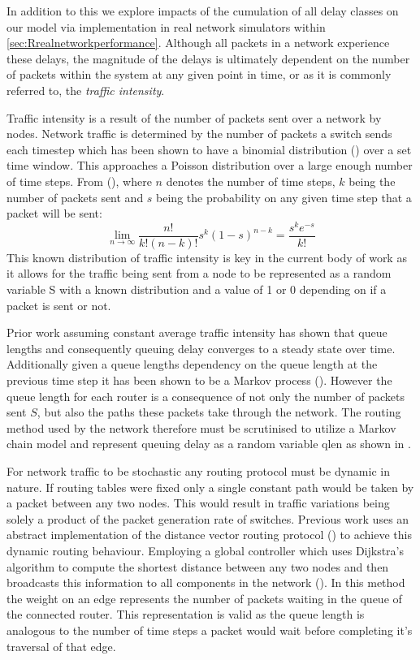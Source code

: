 In addition to this we explore impacts of the cumulation of all delay classes on our model via implementation in real network simulators within \cref{sec:Rrealnetworkperformance}. Although all packets in a network experience these delays, the magnitude of the delays is ultimately dependent on the number of packets within the system at any given point in time, or as it is commonly referred to, the \textit{traffic intensity}.\par
Traffic intensity is a result of the number of packets sent over a network by nodes. Network traffic is determined by the number of packets a switch sends each timestep which has been shown to have a binomial distribution (\cite{barnes_stochastic_2020}) over a set time window. This approaches a Poisson distribution over a large enough number of time steps. From (\cite{barnes_stochastic_2020}), where $n$ denotes the number of time steps, $k$ being the number of packets sent and $s$ being the probability on any given time step that a packet will be sent:
\[\lim_{n\to\infty} \frac{n!}{k!(n-k)!}s^k (1-s)^{n-k} =\frac{s^k e^{-s}}{k!}\]
This known distribution of traffic intensity is key in the current body of work as it allows for the traffic being sent from a node to be represented as a random variable S with a known distribution and a value of 1 or 0 depending on if a packet is sent or not. \par
Prior work assuming constant average traffic intensity has shown that queue lengths and consequently queuing delay converges to a steady state over time. Additionally given a queue lengths dependency on the queue length at the previous time step it has been shown to be a Markov process (\cite{barnes_stochastic_2020}). However the queue length for each router is a consequence of not only the number of packets sent $S$, but also the paths these packets take through the network. The routing method used by the network therefore must be scrutinised to utilize a Markov chain model and represent queuing delay as a random variable \gls{qlen} as shown in \cite{barnes_stochastic_2020}.\par
For network traffic to be stochastic any routing protocol must be dynamic in nature. If routing tables were fixed only a single constant path would be taken by a packet between any two nodes. This would result in traffic variations being solely a product of the packet generation rate of switches. Previous work uses an abstract implementation of the distance vector routing protocol (\cite{perkins_ad_2003}) to achieve this dynamic routing behaviour. Employing a global controller which uses Dijkstra's algorithm to compute the shortest distance between any two nodes and then broadcasts this information to all components in the network (\cite{barnes_stochastic_2020}). In this method the weight on an edge represents the number of packets waiting in the queue of the connected router. This representation is valid as the queue length is analogous to the number of time steps a packet would wait before completing it’s traversal of that edge.\par
